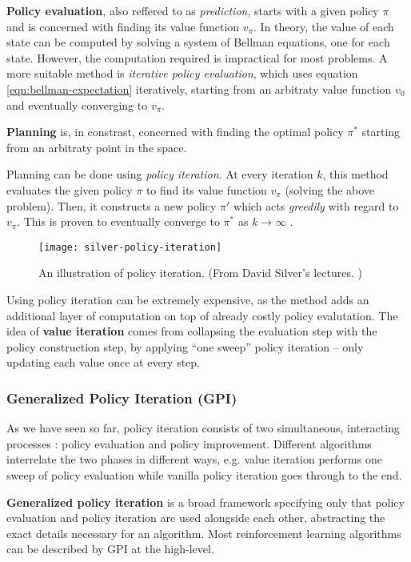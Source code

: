 \textbf{Policy evaluation}, also reffered to as \emph{prediction}, starts with a given policy $\pi$ and is concerned with finding its value function $v_{\pi}$.
In theory, the value of each state can be computed by solving a system of Bellman equations, one for each state.
However, the computation required is impractical for most problems.
A more suitable method is \emph{iterative policy evaluation}, which uses equation \ref{eqn:bellman-expectation} iteratively, starting from an arbitraty value function $v_0$ and eventually converging to $v_{\pi}$.

\textbf{Planning} is, in constrast, concerned with finding the optimal policy $\pi^{*}$ starting from an arbitraty point in the space.

Planning can be done using \emph{policy iteration}.
At every iteration $k$, this method evaluates the given policy $\pi$ to find its value function $v_{\pi}$ (solving the above problem).
Then, it constructs a new policy $\pi'$ which acts \emph{greedily} with regard to $v_{\pi}$.
This is proven to eventually converge to $\pi^*$ as $k \to \infty$ \cite{rlai}.

\begin{figure}[h]
    \caption{An illustration of policy iteration. (From David Silver's lectures. \cite{silver-lectures})}
    \centering
    \texttt{[image: silver-policy-iteration]}
\end{figure}

Using policy iteration can be extremely expensive, as the method adds an additional layer of computation on top of already costly policy evalutation.
The idea of \textbf{value iteration} comes from collapsing the evaluation step with the policy construction step, by applying ``one sweep'' policy iteration -- only updating each value once at every step.

\subsubsection{Generalized Policy Iteration (GPI)}
As we have seen so far, policy iteration consists of two simultaneous, interacting processes \cite{rlai}: policy evaluation and policy improvement.
Different algorithms interrelate the two phases in different ways, e.g. value iteration performs one sweep of policy evaluation while vanilla policy iteration goes through to the end.

\textbf{Generalized policy iteration} is a broad framework specifying only that policy evaluation and policy iteration are used alongside each other, abstracting the exact details necessary for an algorithm.
Most reinforcement learning algorithms can be described by GPI at the high-level.

